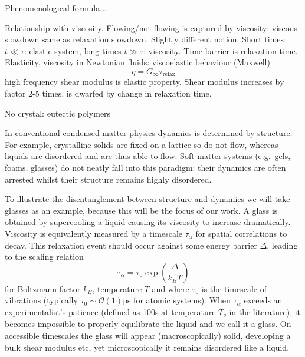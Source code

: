 Phenomenological formula...

Relationship with viscosity.
Flowing/not flowing is captured by viscosity: viscous slowdown same as relaxation slowdown.
Slightly different notion.
Short times $t \ll \tau$: elastic system, long times $t \gg \tau$: viscosity.
Time barrier is relaxation time.
Elasticity, viscosity in Newtonian fluids: viscoelastic behaviour (Maxwell)
\begin{equation}
  \eta = G_\infty \tau_\mathrm{relax}
\end{equation}
high frequency shear modulus is elastic property.
Shear modulus increases by factor 2-5 times, is dwarfed by change in relaxation time.

No crystal: eutectic polymers

In conventional condensed matter physics dynamics is determined by structure.
For example, crystalline solids are fixed on a lattice so do not flow, whereas liquids are disordered and are thus able to flow.
Soft matter systems (e.g.\ gels, foams, glasses) do not neatly fall into this paradigm: their dynamics are often arrested whilst their structure remains highly disordered.

To illustrate the disentanglement between structure and dynamics we will take glasses as an example, because this will be the focus of our work.
A glass is obtained by supercooling a liquid causing its viscosity to increase dramatically.
Viscosity is equivalently measured by a timescale $\tau_\alpha$ for spatial correlations to decay.
This relaxation event should occur against some energy barrier $\Delta$, leading to the scaling relation
\begin{equation}\label{eq:angell}
  \tau_\alpha = \tau_0 \exp{\left(\frac{\Delta}{k_B T}\right)}
\end{equation}
for Boltzmann factor $k_B$, temperature $T$ and where $\tau_0$ is the timescale of vibrations (typically $\tau_0 \sim \mathcal{O}(1)$ps for atomic systems).
When $\tau_\alpha$ exceeds an experimentalist's patience (defined as 100s at temperature $T_g$ in the literature), it becomes impossible to properly equilibrate the liquid and we call it a glass.
On accessible timescales the glass will appear (macroscopically) solid, developing a bulk shear modulus etc, yet microscopically it remains disordered like a liquid. 

